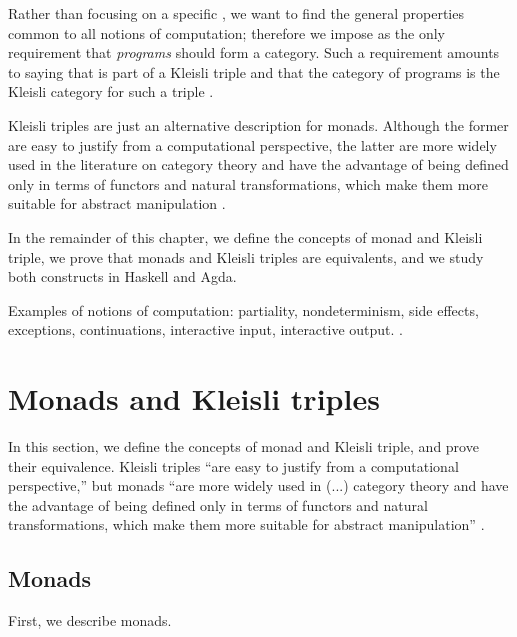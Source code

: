 Rather than focusing on a specific , we want to find the
general properties common to all notions of computation; therefore we
impose as the only requirement that \emph{programs} should form a
category. Such a requirement amounts to saying that  is part
of a Kleisli triple and that the category of programs is the Kleisli
category for such a triple \parencite[58]{moggi-1991}.

Kleisli triples are just an alternative description for monads.
Although the former are easy to justify from a computational
perspective, the latter are more widely used in the literature on
category theory and have the advantage of being defined only in terms
of functors and natural transformations, which make them more suitable
for abstract manipulation \parencite[60]{moggi-1991}.



In the remainder of this chapter, we define the concepts of monad and
Kleisli triple, we prove that monads and Kleisli triples are
equivalents, and we study both constructs in Haskell and Agda.

Examples of notions of computation: partiality, nondeterminism, side
effects, exceptions, continuations, interactive input, interactive
output. \parencite[58]{moggi-1991}.

\section{Monads and Kleisli triples}
\label{sec:monads}

In this section, we define the concepts of monad and Kleisli triple,
and prove their equivalence. Kleisli triples ``are easy to justify
from a computational perspective,'' but monads ``are more widely used
in (...) category theory and have the advantage of being defined only
in terms of functors and natural transformations, which make them more
suitable for abstract manipulation'' \parencite[60]{moggi-1991}.

\subsection*{Monads}

First, we describe monads.

